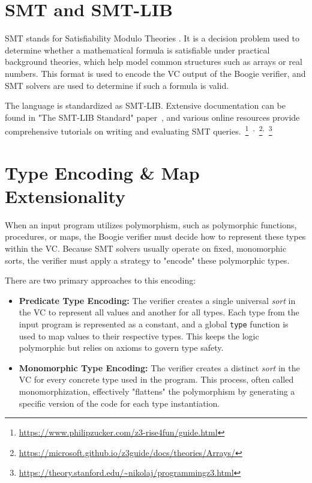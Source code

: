 \section{SMT and SMT-LIB}
SMT stands for Satisfiability Modulo Theories \cite{barrett2010smt}.
It is a decision problem used to determine whether a mathematical formula is satisfiable under practical background theories,
which help model common structures such as arrays or real numbers.
This format is used to encode the VC output of the Boogie verifier,
and SMT solvers are used to determine if such a formula is valid.

The language is standardized as SMT-LIB.
Extensive documentation can be found in "The SMT-LIB Standard" paper~\cite{barrett2010smt},
and various online resources provide comprehensive tutorials on writing and evaluating SMT queries.~\footnote{\url{https://www.philipzucker.com/z3-rise4fun/guide.html}}~\textsuperscript{,}~\footnote{\url{https://microsoft.github.io/z3guide/docs/theories/Arrays/}}\textsuperscript{,}~\footnote{\url{https://theory.stanford.edu/\~nikolaj/programmingz3.html}}


\section{Type Encoding \& Map Extensionality}
\label{sec:type-encoding}

When an input program utilizes polymorphism, such as polymorphic functions, procedures, or maps,
the Boogie verifier must decide how to represent these types within the VC.
Because SMT solvers usually operate on fixed, monomorphic sorts, the verifier must apply a strategy to "encode" these polymorphic types.

There are two primary approaches to this encoding:
\begin{itemize}
\item \textbf{Predicate Type Encoding:} The verifier creates a single universal \emph{sort} in the VC to represent all values and another for all types. Each type from the input program is represented as a constant, and a global \texttt{type} function is used to map values to their respective types. This keeps the logic polymorphic but relies on axioms to govern type safety.
\item \textbf{Monomorphic Type Encoding:} The verifier creates a distinct \emph{sort} in the VC for every concrete type used in the program. This process, often called monomorphization, effectively "flattens" the polymorphism by generating a specific version of the code for each type instantiation.
\end{itemize}


